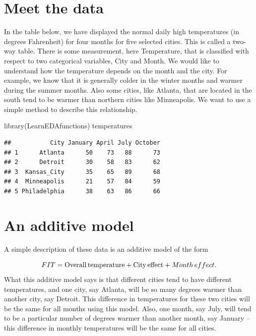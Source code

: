 \documentclass[
]{book}
\newenvironment{Shaded}{\begin{snugshade}}{\end{snugshade}}
\newcommand{\FunctionTok}[1]{\textcolor[rgb]{0.00,0.00,0.00}{#1}}
\newcommand{\NormalTok}[1]{#1}
\begin{document}
\hypertarget{meet-the-data-6}{%
\section{Meet the data}\label{meet-the-data-6}}

In the table below, we have displayed the normal daily high temperatures (in degrees Fahrenheit) for four months for five selected cities. This is called a two-way table. There is some measurement, here Temperature, that is classified with respect to two categorical variables, City and Month. We would like to understand how the temperature depends on the month and the city. For example, we know that it is generally colder in the winter months and warmer during the summer months. Also some cities, like Atlanta, that are located in the south tend to be warmer than northern cities like Minneapolis. We want to use a simple method to describe this relationship.

\begin{Shaded}
\begin{Highlighting}[]
\FunctionTok{library}\NormalTok{(LearnEDAfunctions)}
\NormalTok{temperatures}
\end{Highlighting}
\end{Shaded}

\begin{verbatim}
##           City January April July October
## 1      Atlanta      50    73   88      73
## 2      Detroit      30    58   83      62
## 3  Kansas_City      35    65   89      68
## 4  Minneapolis      21    57   84      59
## 5 Philadelphia      38    63   86      66
\end{verbatim}

\hypertarget{an-additive-model}{%
\section{An additive model}\label{an-additive-model}}

A simple description of these data is an additive model of the form

\[
FIT = {\rm Overall \, temperature} + {\rm City \, effect} + 
{Month \, effect}.
\]
What this additive model says is that different cities tend to have different temperatures, and one city, say Atlanta, will be so many degrees warmer than another city, say Detroit. This difference in temperatures for these two cities will be the same for all months using this model. Also, one month, say July, will tend to be a particular number of degrees warmer than another month, say January -- this difference in monthly temperatures will be the same for all cities.
\end{document}
